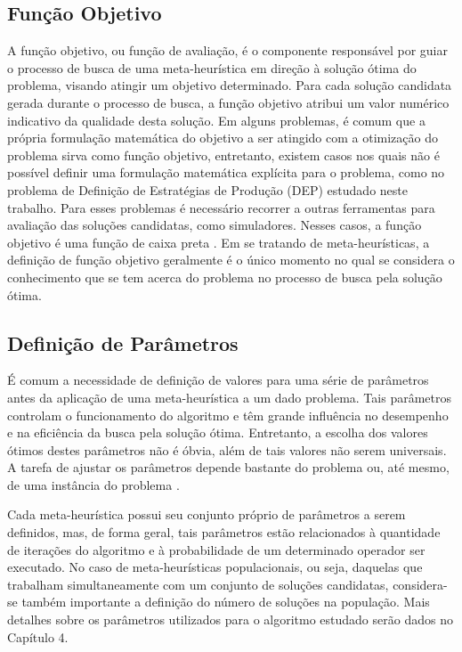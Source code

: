 \subsection{Função Objetivo}
\label{subsec:subc212}
A função objetivo, ou função de avaliação, é o componente responsável por guiar o processo de busca de uma meta-heurística em direção à solução ótima do problema, visando atingir um objetivo determinado. Para cada solução candidata gerada durante o processo de busca, a função objetivo atribui um valor numérico indicativo da qualidade desta solução. Em alguns problemas, é comum que a própria formulação matemática do objetivo a ser atingido com a otimização do problema sirva como função objetivo, entretanto, existem casos nos quais não é possível definir uma formulação matemática explícita para o problema, como no problema de Definição de Estratégias de Produção (DEP) estudado neste trabalho. Para esses problemas é necessário recorrer a outras ferramentas para avaliação das soluções candidatas, como simuladores. Nesses casos, a função objetivo é uma função de caixa preta \cite{Talbi2009}. Em se tratando de meta-heurísticas, a definição de função objetivo geralmente é o único momento no qual se considera o conhecimento que se tem acerca do problema no processo de busca pela solução ótima.

\subsection{Definição de Parâmetros}
\label{subsec:subc213}
É comum a necessidade de definição de valores para uma série de parâmetros antes da aplicação de uma meta-heurística a um dado problema. Tais parâmetros controlam o funcionamento do algoritmo e têm grande influência no desempenho e na eficiência da busca pela solução ótima. Entretanto, a escolha dos valores ótimos destes parâmetros não é óbvia, além de tais valores não serem universais. A tarefa de ajustar os parâmetros depende bastante do problema ou, até mesmo, de uma instância do problema \cite{Talbi2009}.

Cada meta-heurística possui seu conjunto próprio de parâmetros a serem definidos, mas, de forma geral, tais parâmetros estão relacionados à quantidade de iterações do algoritmo e à probabilidade de um determinado operador ser executado. No caso de meta-heurísticas populacionais, ou seja, daquelas que trabalham simultaneamente com um conjunto de soluções candidatas, considera-se também importante a definição do número de soluções na população. Mais detalhes sobre os parâmetros utilizados para o algoritmo estudado serão dados no Capítulo 4.

